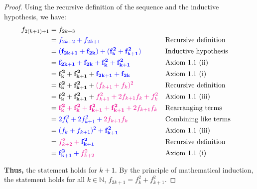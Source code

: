 \documentclass[12pt]{article}
\begin{document}
\begin{proof}
  \noindent Using the recursive definition of the sequence and the inductive hypothesis, we have:
  \begin{align*}
    f_{2(k+1)+1} & = f_{2k+3} \\
                 & = \color{blue}{f_{2k+2}} + \color{blue}{f_{2k+1}}                                                                                                             && \text{Recursive definition} \\
                 & = \color{blue}{(\mathbf{f_{2k+1}} + \mathbf{f_{2k}})} + (\mathbf{f_k^2} + \mathbf{f_{k+1}^2})                                                                 && \text{Inductive hypothesis} \\
                 & = \color{blue}{\mathbf{f_{2k+1}}} + \color{blue}{\mathbf{f_{2k}}} + \mathbf{f_k^2} + \mathbf{f_{k+1}^2}                                                       && \text{Axiom 1.1 (ii)} \\
                 & = \mathbf{f_k^2} + \mathbf{f_{k+1}^2} + \color{blue}{\mathbf{f_{2k+1}}} + \color{blue}{\mathbf{f_{2k}}}                                                       && \text{Axiom 1.1 (i)} \\
                 & = \mathbf{f_k^2} + \mathbf{f_{k+1}^2} + \color{magenta}{(f_{k+1} + f_k)^2}                                                                                    && \text{Recursive definition} \\
                 & = \mathbf{f_k^2} + \mathbf{f_{k+1}^2} + \color{magenta}{f_{k+1}^2} + \color{magenta}{2f_{k+1}f_k} + \color{magenta}{f_k^2}                                    && \text{Axiom 1.1 (iii)} \\
                 & = \color{magenta}{\mathbf{f_k^2}} + \color{magenta}{\mathbf{f_k^2}} + \mathbf{f_{k+1}^2} + \color{magenta}{\mathbf{f_{k+1}^2}} + \color{magenta}{2f_{k+1}f_k} && \text{Rearranging terms} \\
                 & = \color{blue}{2f_k^2} + \color{blue}{2f_{k+1}^2} + \color{magenta}{2f_{k+1}f_k}                                                                              && \text{Combining like terms} \\
                 & = \color{blue}{(f_k + f_{k+1})^2} + \color{blue}{\mathbf{f_{k+1}^2}}                                                                                          && \text{Axiom 1.1 (iii)} \\
                 & = \color{magenta}{f_{k+2}^2} + \color{blue}{\mathbf{f_{k+1}^2}}                                                                                               && \text{Recursive definition} \\
                 & = \color{blue}{\mathbf{f_{k+1}^2}} + \color{magenta}{f_{k+2}^2}                                                                                               && \text{Axiom 1.1 (i)} \\
  \end{align*}

  \noindent \textbf{Thus,} the statement holds for $k+1$. By the principle of mathematical induction, the statement holds for all $k \in \mathbb{N}$, $f_{2k+1} = f_k^2 + f_{k+1}^2$.
\end{proof}
\end{document}
